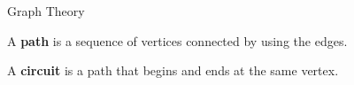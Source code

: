    \begin{frame}[fragile]{Graph Theory}
\begin{definition}[Path]
A \textbf{path} is a sequence of vertices connected by using the edges.
\end{definition}

\begin{definition}[Circuit]
A \textbf{circuit} is a path that begins and ends at the same vertex.
\end{definition}





\end{frame}

